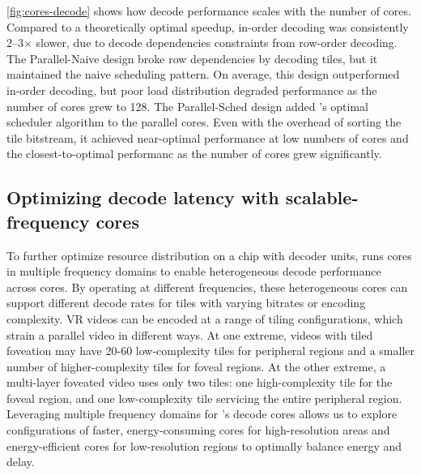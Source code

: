 \ref{fig:cores-decode} shows how decode performance scales with the number of cores.
Compared to a theoretically optimal speedup, in-order decoding was consistently 2--3$\times$ slower, due to decode dependencies constraints from row-order decoding.
The Parallel-Naive design broke row dependencies by decoding tiles, but it maintained the naive scheduling pattern.
On average, this design outperformed in-order decoding, but poor load distribution degraded performance as the number of cores grew to 128.
The Parallel-Sched design added \nameArch's optimal scheduler algorithm to the parallel cores.
Even with the overhead of sorting the tile bitstream, it achieved near-optimal performance at low numbers of cores and the closest-to-optimal performanc as the number of cores grew significantly.

\dvfsEnergySpeedup

\subsection{Optimizing decode latency with scalable-frequency cores}
\label{subsec:hetero-cores}

To further optimize resource distribution on a chip with decoder units, \nameArch runs cores in multiple frequency domains to enable heterogeneous decode performance across cores.
By operating at different frequencies, these heterogeneous cores can support different decode rates for tiles with varying bitrates or encoding complexity.
VR videos can be encoded at a range of tiling configurations, which strain a parallel video in different ways.
At one extreme, videos with tiled foveation may have 20-60 low-complexity tiles for peripheral regions and a smaller number of higher-complexity tiles for foveal regions.
At the other extreme, a multi-layer foveated video uses only two tiles: one high-complexity tile for the foveal region, and one low-complexity tile servicing the entire peripheral region.
Leveraging multiple frequency domains for \nameArch's decode cores allows us to explore configurations of faster, energy-consuming cores for high-resolution areas and energy-efficient cores for low-resolution regions to optimally balance energy and delay.

